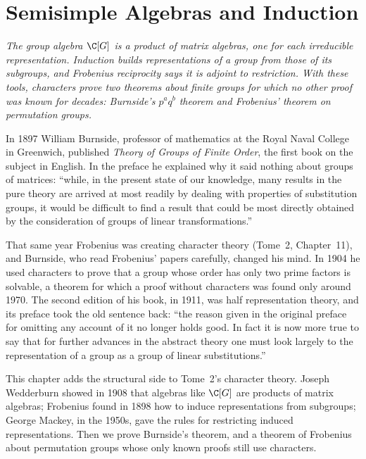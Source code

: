 \chapter{Semisimple Algebras and Induction}

\begin{center}\itshape
The group algebra $\C[G]$ is a product of matrix algebras, one for each irreducible representation. Induction builds representations of a group from those of its subgroups, and Frobenius reciprocity says it is
adjoint to restriction. With these tools, characters prove two theorems about finite groups for which no other proof was known for decades: Burnside's $p^aq^b$ theorem and Frobenius' theorem on permutation groups.
\end{center}

In 1897 William Burnside, professor of mathematics at the Royal Naval College in Greenwich, published \emph{Theory of Groups of Finite Order}, the first book on the subject in English.
In the preface he explained why it said nothing about groups of matrices: ``while, in the present state of our knowledge, many results in the pure theory are arrived at most readily by dealing with properties of
substitution groups, it would be difficult to find a result that could be most directly obtained by the consideration of groups of linear transformations.''

That same year Frobenius was creating character theory (Tome~2, Chapter~11), and Burnside, who read Frobenius' papers carefully, changed his mind. In 1904 he used characters to prove that a group whose order has only
two prime factors is solvable, a theorem for which a proof without characters was found only around 1970. The second edition of his book, in 1911, was half representation theory, and its preface took the old
sentence back: ``the reason given in the original preface for omitting any account of it no longer holds good. In fact it is now more true to say that for further advances in the abstract theory one must look largely to the
representation of a group as a group of linear substitutions.''

This chapter adds the structural side to Tome~2's character theory. Joseph Wedderburn showed in 1908 that algebras like $\C[G]$ are products of matrix algebras; Frobenius found in 1898 how to induce representations from
subgroups; George Mackey, in the 1950s, gave the rules for restricting induced representations. Then we prove Burnside's theorem, and a theorem of Frobenius about permutation groups whose only known proofs still use
characters.

